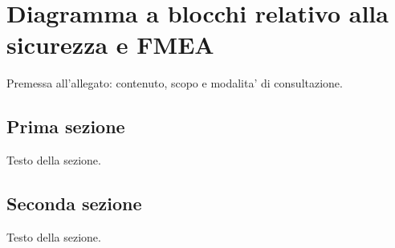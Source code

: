 \chapter{Diagramma a blocchi relativo alla sicurezza e FMEA}
\label{app:B}

Premessa all'allegato: contenuto, scopo e modalita' di consultazione.

\section{Prima sezione}
\label{sec:appB-1}

Testo della sezione.

\section{Seconda sezione}
\label{sec:appB-2}

Testo della sezione.

